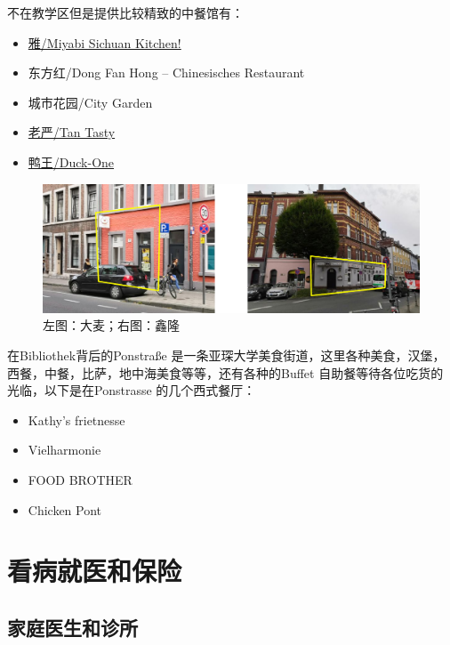     不在教学区但是提供比较精致的中餐馆有：

    \begin{itemize}
      \item \href{https://miyabi-sichuan-kitchen.business.site/}{雅/Miyabi Sichuan Kitchen!}
      \item 东方红/Dong Fan Hong – Chinesisches Restaurant
      \item 城市花园/City Garden
      \item \href{https://yan-tasty.business.site/}{老严/Tan Tasty}
      \item \href{https://duck-one.business.site/}{鸭王/Duck-One}
    \end{itemize}

    \begin{figure}
      \centering
      \includegraphics[width=.8\textwidth]{在亚琛学习和生活/日常消费和饮食/大麦鑫隆.png}
      \caption{左图：大麦；右图：鑫隆}
      \label{fig:大麦鑫隆}
    \end{figure}

    在Bibliothek背后的Ponstraße 是一条亚琛大学美食街道，这里各种美食，汉堡，西餐，中餐，比萨，地中海美食等等，还有各种的Buffet 自助餐等待各位吃货的光临，以下是在Ponstrasse 的几个西式餐厅：

    \begin{itemize}
      \item Kathy’s frietnesse
      \item Vielharmonie 
      \item FOOD BROTHER
      \item Chicken Pont
    \end{itemize}

\section{看病就医和保险}\label{sec:看病就医和保险}

  \subsection{家庭医生和诊所}\label{subsec:家庭医生和诊所}

